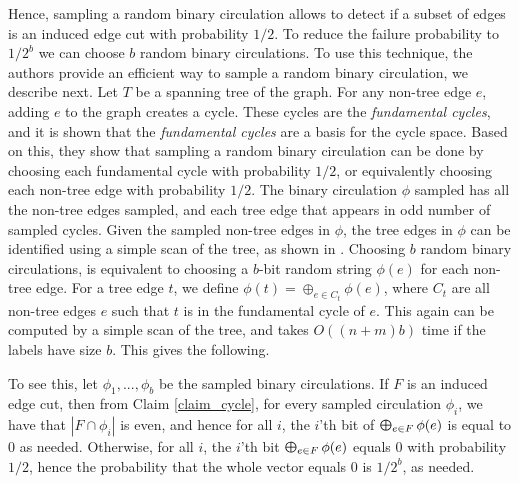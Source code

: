 Hence, sampling a random binary circulation allows to detect if a subset of edges is an induced edge cut with probability $1/2$. To reduce the failure probability to $1/2^b$ we can choose $b$ random binary circulations. To use this technique, the authors provide an efficient way to sample a random binary circulation, we describe next. Let $T$ be a spanning tree of the graph. For any non-tree edge $e$, adding $e$ to the graph creates a cycle. These cycles are the \emph{fundamental cycles}, and it is shown that the \emph{fundamental cycles} are a basis for the cycle space. Based on this, they show that sampling a random binary circulation can be done by choosing each fundamental cycle with probability $1/2$, or equivalently choosing each non-tree edge with probability $1/2$. The binary circulation $\phi$ sampled has all the non-tree edges sampled, and each tree edge that appears in odd number of sampled cycles. Given the sampled non-tree edges in $\phi$, the tree edges in $\phi$ can be identified using a simple scan of the tree, as shown in \cite{pritchard2011fast}. Choosing $b$ random binary circulations, is equivalent to choosing a $b$-bit random string $\phi(e)$ for each non-tree edge. For a tree edge $t$, we define $\phi(t) = \oplus_{e \in C_t} \phi(e)$, where $C_t$ are all non-tree edges $e$ such that $t$ is in the fundamental cycle of $e$. This again can be computed by a simple scan of the tree, and takes $O((n+m)b)$ time if the labels have size $b$. This gives the following.

\cycle*

To see this, let $\phi_1,...,\phi_b$ be the sampled binary circulations. If $F$ is an induced edge cut, then from Claim \ref{claim_cycle}, for every sampled circulation $\phi_i$, we have that $|F \cap \phi_i|$ is even, and hence for all $i$, the $i$'th bit of $\Moplus_{e \in F} \phi(e)$ is equal to 0 as needed. Otherwise, for all $i$, the $i$'th bit $\Moplus_{e \in F} \phi(e)$ equals $0$ with probability $1/2$, hence the probability that the whole vector equals $0$ is $1/2^b$, as needed.